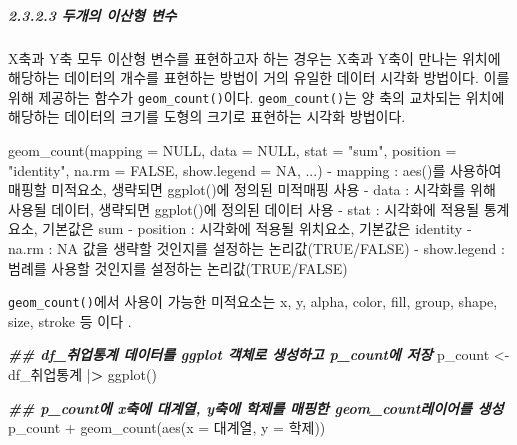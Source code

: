 \documentclass[
]{article}
\newenvironment{Shaded}{\begin{snugshade}}{\end{snugshade}}
\newcommand{\AttributeTok}[1]{\textcolor[rgb]{0.77,0.63,0.00}{#1}}
\newcommand{\ConstantTok}[1]{\textcolor[rgb]{0.00,0.00,0.00}{#1}}
\newcommand{\DocumentationTok}[1]{\textcolor[rgb]{0.56,0.35,0.01}{\textbf{\textit{#1}}}}
\newcommand{\ErrorTok}[1]{\textcolor[rgb]{0.64,0.00,0.00}{\textbf{#1}}}
\newcommand{\FunctionTok}[1]{\textcolor[rgb]{0.00,0.00,0.00}{#1}}
\newcommand{\NormalTok}[1]{#1}
\newcommand{\OtherTok}[1]{\textcolor[rgb]{0.56,0.35,0.01}{#1}}
\newcommand{\SpecialCharTok}[1]{\textcolor[rgb]{0.00,0.00,0.00}{#1}}
\newcommand{\StringTok}[1]{\textcolor[rgb]{0.31,0.60,0.02}{#1}}
\begin{document}
\hypertarget{uxb450uxac1cuxc758-uxc774uxc0b0uxd615-uxbcc0uxc218}{%
\subparagraph{2.3.2.3 두개의 이산형 변수}\label{uxb450uxac1cuxc758-uxc774uxc0b0uxd615-uxbcc0uxc218}}

X축과 Y축 모두 이산형 변수를 표현하고자 하는 경우는 X축과 Y축이 만나는 위치에 해당하는 데이터의 개수를 표현하는 방법이 거의 유일한 데이터 시각화 방법이다. 이를 위해 제공하는 함수가 \texttt{geom\_count()}이다. \texttt{geom\_count()}는 양 축의 교차되는 위치에 해당하는 데이터의 크기를 도형의 크기로 표현하는 시각화 방법이다.

\begin{Shaded}
\begin{Highlighting}[]
\FunctionTok{geom\_count}\NormalTok{(}\AttributeTok{mapping =} \ConstantTok{NULL}\NormalTok{, }\AttributeTok{data =} \ConstantTok{NULL}\NormalTok{, }\AttributeTok{stat =} \StringTok{"sum"}\NormalTok{, }\AttributeTok{position =} \StringTok{"identity"}\NormalTok{, }\AttributeTok{na.rm =} \ConstantTok{FALSE}\NormalTok{,}
  \AttributeTok{show.legend =} \ConstantTok{NA}\NormalTok{, ...)}
  \SpecialCharTok{{-}}\NormalTok{ mapping }\SpecialCharTok{:} \FunctionTok{aes}\NormalTok{()를 사용하여 매핑할 미적요소, 생략되면 }\FunctionTok{ggplot}\NormalTok{()에 정의된 미적매핑 사용}
  \SpecialCharTok{{-}}\NormalTok{ data }\SpecialCharTok{:}\NormalTok{ 시각화를 위해 사용될 데이터, 생략되면 }\FunctionTok{ggplot}\NormalTok{()에 정의된 데이터 사용}
  \SpecialCharTok{{-}}\NormalTok{ stat }\SpecialCharTok{:}\NormalTok{ 시각화에 적용될 통계요소, 기본값은 }\StringTok{\textquotesingle{}sum\textquotesingle{}}
  \SpecialCharTok{{-}}\NormalTok{ position }\SpecialCharTok{:}\NormalTok{ 시각화에 적용될 위치요소, 기본값은 }\StringTok{\textquotesingle{}identity\textquotesingle{}}
  \SpecialCharTok{{-}}\NormalTok{ na.rm }\SpecialCharTok{:} \ConstantTok{NA}\NormalTok{ 값을 생략할 것인지를 설정하는 논리값(}\ConstantTok{TRUE}\SpecialCharTok{/}\ConstantTok{FALSE}\NormalTok{)}
  \SpecialCharTok{{-}}\NormalTok{ show.legend }\SpecialCharTok{:}\NormalTok{ 범례를 사용할 것인지를 설정하는 논리값(}\ConstantTok{TRUE}\SpecialCharTok{/}\ConstantTok{FALSE}\NormalTok{) }
\end{Highlighting}
\end{Shaded}

\texttt{geom\_count()}에서 사용이 가능한 미적요소는 x, y, alpha, color, fill, group, shape, size, stroke 등 이다 .

\begin{Shaded}
\begin{Highlighting}[]
\DocumentationTok{\#\#  df\_취업통계 데이터를 ggplot 객체로 생성하고 p\_count에 저장}
\NormalTok{p\_count }\OtherTok{\textless{}{-}}\NormalTok{ df\_취업통계 }\SpecialCharTok{|}\ErrorTok{\textgreater{}} 
  \FunctionTok{ggplot}\NormalTok{()}

\DocumentationTok{\#\# p\_count에 x축에 대계열, y축에 학제를 매핑한 geom\_count레이어를 생성}
\NormalTok{p\_count }\SpecialCharTok{+} 
  \FunctionTok{geom\_count}\NormalTok{(}\FunctionTok{aes}\NormalTok{(}\AttributeTok{x =}\NormalTok{ 대계열, }\AttributeTok{y =}\NormalTok{ 학제))}
\end{Highlighting}
\end{Shaded}
\end{document}
